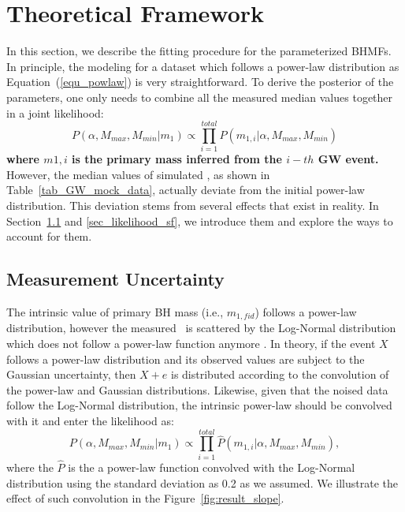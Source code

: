 \documentclass[twocolumn]{aastex62}
\begin{document}
\section{Theoretical Framework}  \label{sec_theory}
In this section, we describe the fitting procedure for the parameterized BHMFs. 
In principle, the modeling for a dataset which follows a power-law distribution as Equation~(\ref{equ_powlaw}) is very straightforward. To derive the posterior of the parameters, one only needs to combine all the measured median values together in a joint likelihood:
 \begin{equation} \label{equ_lik_powlaw}
 P(\alpha, M_{max}, M_{min}|m_{1}) \propto  \prod_{i=1}^{total} P(m_{1,i}|\alpha, M_{max}, M_{min})
 \end{equation}
 \textbf{where $m{1,i}$ is the primary mass inferred from the $i-th$ GW event.}
However, the median values of simulated \mone, as shown in Table~\ref{tab_GW_mock_data}, actually deviate from the initial power-law distribution. This deviation stems from several effects that exist in reality. In Section~\ref{sec_likelihood_noise} and \ref{sec_likelihood_sf}, we introduce them and explore the ways to account for them.

\subsection{Measurement Uncertainty}\label{sec_likelihood_noise}
The intrinsic value of primary BH mass (i.e., $m_{1,fid}$) follows a power-law distribution, however the measured  \mone\ is scattered by the Log-Normal distribution which does not follow a power-law function anymore \citep{Koen2009}. In theory, if the event $X$ follows a power-law distribution and its observed values are subject to the Gaussian uncertainty, then $X + e$ is distributed according to the convolution of the power-law and Gaussian distributions. Likewise, given that the noised data follow the Log-Normal distribution, the intrinsic power-law should be convolved with it and enter the likelihood as:
 \begin{equation} \label{equ_lik_conv}
 P(\alpha, M_{max}, M_{min}|m_{1}) \propto  \prod_{i=1}^{total} \hat{P}(m_{1,i}|\alpha, M_{max}, M_{min}),
 \end{equation}
where the $\hat{P}$ is the a power-law function convolved with the Log-Normal distribution using the standard deviation as 0.2 as we assumed. We illustrate the effect of such convolution in the Figure~\ref{fig:result_slope}.
\end{document}
